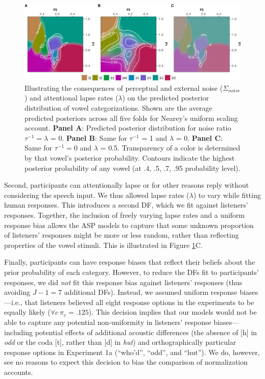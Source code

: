 \documentclass[preprint]{JASA}
\begin{document}
\begin{figure}[!ht]

{\centering \includegraphics[width=0.95\linewidth]{./Figure8} 

}

\caption{Illustrating the consequences of perceptual and external noise (\(\Sigma_{noise}\)) and attentional lapse rates (\(\lambda\)) on the predicted posterior distribution of vowel categorizations. Shown are the average predicted posteriors across all five folds for Nearey's uniform scaling account. \textbf{Panel A}: Predicted posterior distribution for noise ratio \(\tau^{-1} = \lambda\) = 0. \textbf{Panel B}: Same for \(\tau^{-1}\) = 1 and \(\lambda\) = 0. \textbf{Panel C}: Same for \(\tau^{-1} = 0\) and \(\lambda\) = 0.5. Transparency of a color is determined by that vowel's posterior probability. Contours indicate the highest posterior probability of any vowel (at .4, .5, .7, .95 probability level).}\label{fig:prediction-landscapes}
\end{figure}

Second, participants can attentionally lapse or for other reasons reply without considering the speech input. We thus allowed lapse rates (\(\lambda\)) to vary while fitting human responses. This introduces a second DF, which we fit against listeners' responses. Together, the inclusion of freely varying lapse rates and a uniform response bias allows the ASP models to capture that some unknown proportion of listeners' responses might be more or less random, rather than reflecting properties of the vowel stimuli. This is illustrated in Figure \ref{fig:prediction-landscapes}C.

Finally, participants can have response biases that reflect their beliefs about the prior probability of each category. However, to reduce the DFs fit to participants' responses, we did \emph{not} fit this response bias against listeners' responses (thus avoiding \(J - 1 = 7\) additional DFs). Instead, we assumed uniform response biases---i.e., that listeners believed all eight response options in the experiments to be equally likely (\(\forall c\ \pi_c = .125\)). This decision implies that our models would not be able to capture any potential non-uniformity in listeners' response biases---including potential effects of additional acoustic differences (the absence of {[}h{]} in \emph{odd} or the coda {[}t{]}, rather than {[}d{]} in \emph{hut}) and orthographically particular response options in Experiment 1a (``who'd'', ``odd'', and ``hut''). We do, however, see no reasons to expect this decision to bias the comparison of normalization accounts.
\end{document}
